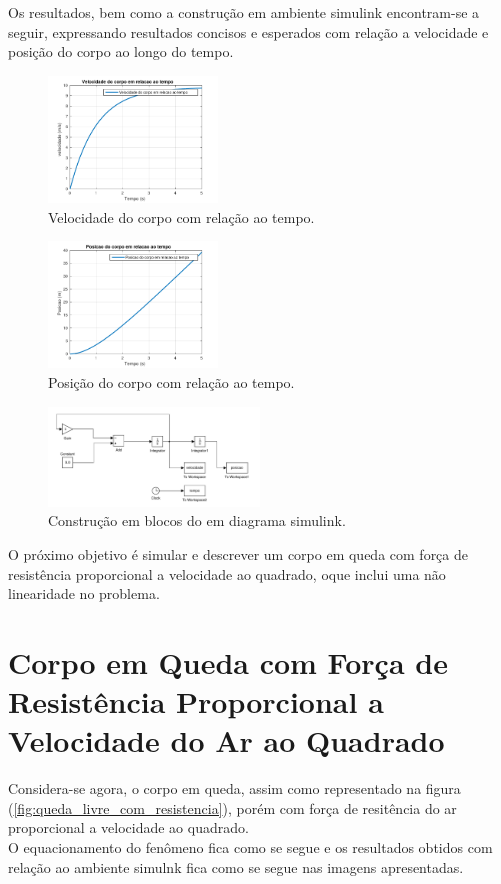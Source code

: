 \documentclass[DIV=calc, paper=a4, fontsize=11pt, twocolumn]{scrartcl}	 %
\begin{document}
\newpage

Os resultados, bem como a construção em ambiente simulink encontram-se a seguir, expressando resultados concisos e esperados com relação a velocidade e posição
do corpo ao longo do tempo.

\begin{figure}[h!]
\centering
\includegraphics[width=0.4\textwidth]{velocidade}
\caption{Velocidade do corpo com relação ao tempo.}
\label{fig:velocidade}
\end{figure}

\begin{figure}[h!]
\centering
\includegraphics[width=0.4\textwidth]{posicao}
\caption{Posição do corpo com relação ao tempo.}
\label{fig:posicao}
\end{figure}

\newpage

\begin{figure}[h!]
\centering
\includegraphics[width=0.5\textwidth]{blocos}
\caption{Construção em blocos do em diagrama simulink.}
\label{fig:blocos}
\end{figure}

O próximo objetivo é simular e descrever um corpo em queda com força de resistência proporcional a velocidade ao quadrado, oque inclui uma não linearidade no
problema.

\section*{Corpo em Queda com Força de Resistência Proporcional a Velocidade do Ar ao Quadrado}
Considera-se agora, o corpo em queda, assim como representado na figura (\ref{fig:queda_livre_com_resistencia}), porém com força de resitência do ar proporcional a velocidade ao quadrado.\\
O equacionamento do fenômeno fica como se segue e os resultados obtidos com relação ao ambiente simulnk fica como se segue nas imagens apresentadas.
\end{document}
